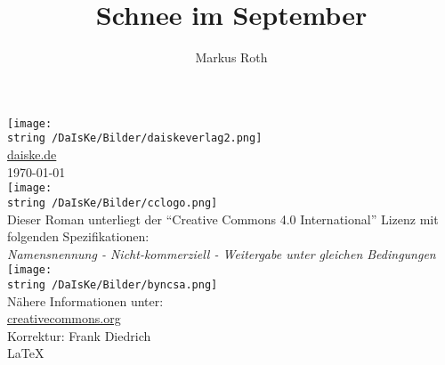 \documentclass[10pt,oneside]{book}
\title{Schnee im September}
\author{Markus Roth}
\begin{document}
%
%
\begin{titlepage}
\end{titlepage}
%
%
\thispagestyle{empty}
\begin{center}
\texttt{[image: \\string~/DaIsKe/Bilder/daiskeverlag2.png]}\\
\href{http://daiske.de}{daiske.de}\\
\vspace{5cm}
\today\\
\vspace{\fill}
\texttt{[image: \\string~/DaIsKe/Bilder/cclogo.png]}\\
Dieser Roman unterliegt der "`Creative Commons 4.0 International"' Lizenz mit folgenden Spezifikationen:\\
\textit{Namensnennung - Nicht-kommerziell - Weitergabe unter gleichen Bedingungen}\\
\texttt{[image: \\string~/DaIsKe/Bilder/byncsa.png]}\\
Nähere Informationen unter:\\
\href{http://creativecommons.org/licenses/by-nc-sa/4.0/}{creativecommons.org}\\
\vspace{5mm}
Korrektur: Frank Diedrich\\
\vspace{5mm}
\LaTeX
\end{center}
%
%
\end{document}

